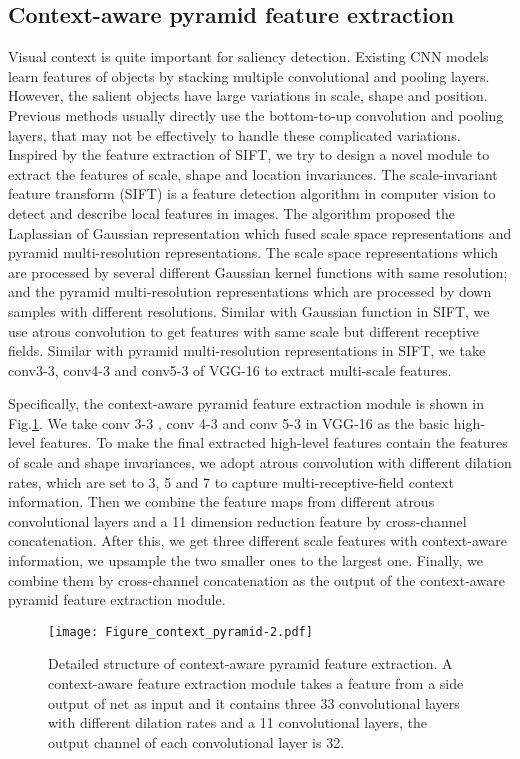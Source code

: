 \documentclass[10pt,twocolumn,letterpaper]{article}
\begin{document}
\subsection{Context-aware pyramid feature extraction}
Visual context is quite important for saliency detection. Existing CNN models learn features of objects by stacking multiple convolutional and pooling layers. However, the salient objects have large variations in scale, shape and position. Previous methods usually directly use the bottom-to-up convolution and pooling layers, that may not be effectively to handle these complicated variations. Inspired by the feature extraction of SIFT\cite{sift}, we try to design a novel module to extract the features of scale, shape and location invariances. The scale-invariant feature transform (SIFT)  is a feature detection algorithm in computer vision to detect and describe local features in images. The algorithm proposed the Laplassian of Gaussian representation\cite{sift} which fused scale space representations and pyramid multi-resolution representations. The scale space representations which are processed by several different Gaussian kernel functions with same resolution; and the pyramid multi-resolution representations which are processed by down samples with different resolutions. Similar with Gaussian function in SIFT, we use atrous convolution \cite{deeplab} to get features with same scale but different receptive fields. Similar with pyramid multi-resolution representations in SIFT, we take conv3-3, conv4-3 and conv5-3 of VGG-16 \cite{vgg} to extract multi-scale features.


Specifically, the context-aware pyramid feature extraction module is shown in Fig.\ref {fig:Figure_3_pyramid}. We take conv 3-3 , conv 4-3 and conv 5-3 in VGG-16 as the basic high-level features. To make the final extracted high-level features contain the features of scale and shape invariances, we adopt atrous convolution with different dilation rates, which are set to 3, 5 and 7 to capture multi-receptive-field context information. Then we combine the feature maps from different atrous convolutional layers and a 11 dimension reduction feature by cross-channel concatenation. After this, we get three different scale features with context-aware information, we upsample the two smaller ones to the largest one. Finally, we combine them  by cross-channel concatenation as the output of the context-aware pyramid feature extraction module.

\begin{figure}[t]
\centering
\texttt{[image: Figure\_context\_pyramid-2.pdf]}
\caption{ Detailed structure of context-aware pyramid feature extraction. A context-aware feature extraction module takes a feature from
a side output of  net as input and it contains three 33 convolutional layers with different dilation rates and a 11 convolutional layers, the output channel of each convolutional layer is 32.}
\label{fig:Figure_3_pyramid}
\end{figure}
\end{document}
